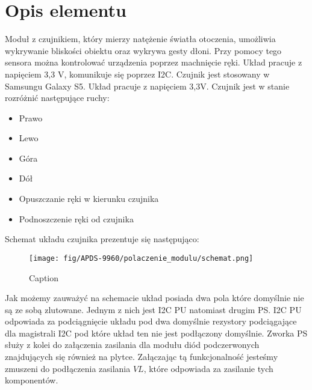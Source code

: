 \documentclass[11pt, a4paper]{article}
\institute{Instytut Robotyki i Inteligencji Maszynowej}
\begin{document}
\newpage

\section*{Opis elementu} 
Moduł z czujnikiem, który mierzy natężenie światła otoczenia, umożliwia wykrywanie bliskości obiektu oraz wykrywa gesty dłoni. Przy pomocy tego sensora można kontrolować urządzenia poprzez machnięcie ręki. Układ pracuje z napięciem 3,3 V, komunikuje się poprzez I2C. Czujnik jest stosowany w Samsungu Galaxy S5. Układ pracuje z napięciem 3,3V. Czujnik jest w stanie rozróżnić następujące ruchy:
\begin{itemize}
    \item Prawo
    \item Lewo
    \item Góra
    \item Dół
    \item Opuszczanie ręki w kierunku czujnika
    \item Podnoszczenie ręki od czujnika
\end{itemize}
Schemat układu czujnika prezentuje się następująco:
\begin{figure}[H]
    \centering
    \texttt{[image: fig/APDS-9960/polaczenie\_modulu/schemat.png]}
    \caption{Caption}
\end{figure}
Jak możemy zauważyć na schemacie układ posiada dwa pola które domyślnie nie są ze sobą zlutowane. Jednym z nich jest I2C PU natomiast drugim PS. I2C PU odpowiada za podciągnięcie układu pod dwa domyślnie rezystory podciągające dla magistrali I2C pod które układ ten nie jest podłączony domyślnie. Zworka PS służy z kolei do załączenia zasilania dla modułu diód podczerwonych znajdujących się również na plytce. Załączając tą funkcjonalność jesteśmy zmuszeni do podłączenia zasilania $VL$, które odpowiada za zasilanie tych komponentów.


\newpage
\end{document}
